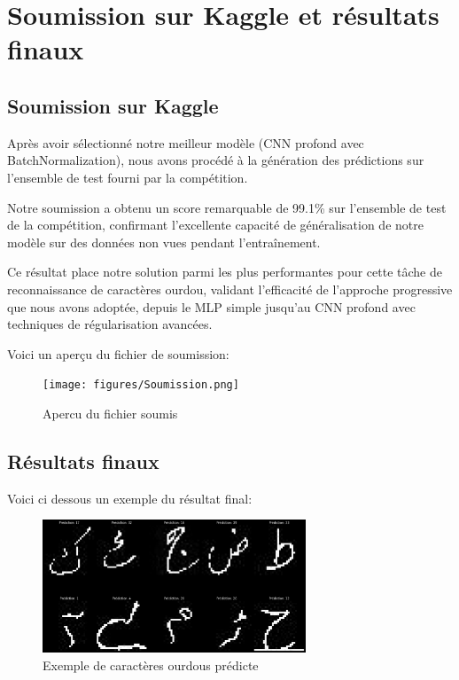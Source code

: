 \section{Soumission sur Kaggle et résultats finaux}
\subsection{Soumission sur Kaggle}
\begin{flushleft}
Après avoir sélectionné notre meilleur modèle (CNN profond avec BatchNormalization), nous avons procédé à la génération des prédictions sur l'ensemble de test fourni par la compétition.

\bigskip

Notre soumission a obtenu un score remarquable de 99.1\% sur l'ensemble de test de la compétition, confirmant l'excellente capacité de généralisation de notre modèle sur des données non vues pendant l'entraînement.

\bigskip

Ce résultat place notre solution parmi les plus performantes pour cette tâche de reconnaissance de caractères ourdou, validant l'efficacité de l'approche progressive que nous avons adoptée, depuis le MLP simple jusqu'au CNN profond avec techniques de régularisation avancées.

\bigskip 

Voici un aperçu du fichier de soumission:
\end{flushleft}

\begin{figure}[h]
\centering
\texttt{[image: figures/Soumission.png]}
\caption{Apercu du fichier soumis}
\label{fig:urdu_chars_soumission}
\end{figure}

\subsection{Résultats finaux}
\begin{flushleft}
Voici ci dessous un exemple du résultat final:  
\end{flushleft}

\begin{figure}[h]
\centering
\includegraphics[width=0.7\textwidth]{figures/Prédiction.png}
\caption{Exemple de caractères ourdous prédicte}
\label{fig:urdu_chars_prédicte}
\end{figure}